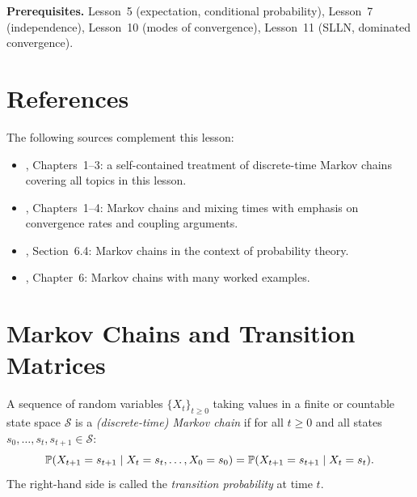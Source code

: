 \documentclass[11pt,a4paper]{article}
\begin{document}
\medskip
\noindent\textbf{Prerequisites.}
Lesson~5 (expectation, conditional probability), Lesson~7
(independence), Lesson~10 (modes of convergence), Lesson~11
(SLLN, dominated convergence).


\section{References}
\label{sec:references}

The following sources complement this lesson:
\begin{itemize}[nosep]
  \item \citet{norris1997}, Chapters~1--3: a self-contained
    treatment of discrete-time Markov chains covering all topics
    in this lesson.
  \item \citet{levin2017}, Chapters~1--4: Markov chains and mixing
    times with emphasis on convergence rates and coupling arguments.
  \item \citet{durrett2019}, Section~6.4: Markov chains in the
    context of probability theory.
  \item \citet{grimmett2001}, Chapter~6: Markov chains with many
    worked examples.
\end{itemize}


\section{Markov Chains and Transition Matrices}
\label{sec:mc_def}

\begin{definition}
\label{def:markov_chain}
A sequence of random variables $\{X_t\}_{t \geq 0}$ taking values
in a finite or countable state space $\mathcal{S}$ is a
\emph{(discrete-time) Markov chain} if for all $t \geq 0$ and
all states $s_0, \ldots, s_t, s_{t+1} \in \mathcal{S}$:
\begin{equation}
  \mathbb{P}(X_{t+1} = s_{t+1} \mid X_t = s_t, \ldots, X_0 = s_0)
  = \mathbb{P}(X_{t+1} = s_{t+1} \mid X_t = s_t).
  \label{eq:markov_property}
\end{equation}
The right-hand side is called the \emph{transition probability}
at time $t$.
\end{definition}
\end{document}
